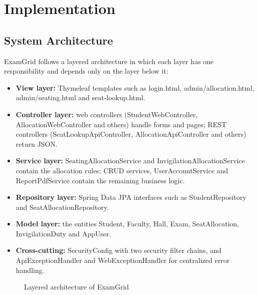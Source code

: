 \documentclass[12pt,letterpaper]{article}
\renewcommand{\texttt}[1]{#1}
\renewcommand{\thesection}{\arabic{section}}
\newcommand{\chapter}[1]{\clearpage\refstepcounter{section}\section*{#1}\label{ch:\thesection}}
\begin{document}
\chapter{Implementation}
\subsection{System Architecture}
ExamGrid follows a layered architecture in which each layer has one responsibility and depends only on the layer below it:
\begin{itemize}
  \item \textbf{View layer:} Thymeleaf templates such as \texttt{login.html}, \texttt{admin/allocation.html}, \texttt{admin/seating.html} and \texttt{seat-lookup.html}.
  \item \textbf{Controller layer:} web controllers (\texttt{StudentWebController}, \texttt{AllocationWebController} and others) handle forms and pages; REST controllers (\texttt{SeatLookupApiController}, \texttt{AllocationApiController} and others) return JSON.
  \item \textbf{Service layer:} \texttt{SeatingAllocationService} and \texttt{InvigilationAllocationService} contain the allocation rules; CRUD services, \texttt{UserAccountService} and \texttt{ReportPdfService} contain the remaining business logic.
  \item \textbf{Repository layer:} Spring Data JPA interfaces such as \texttt{StudentRepository} and \texttt{SeatAllocationRepository}.
  \item \textbf{Model layer:} the entities \texttt{Student}, \texttt{Faculty}, \texttt{Hall}, \texttt{Exam}, \texttt{SeatAllocation}, \texttt{InvigilationDuty} and \texttt{AppUser}.
  \item \textbf{Cross-cutting:} \texttt{SecurityConfig} with two security filter chains, and \texttt{ApiExceptionHandler} and \texttt{WebExceptionHandler} for centralized error handling.
\end{itemize}
\begin{figure}[H]\centering
\resizebox{0.8\linewidth}{!}{}
\caption{Layered architecture of ExamGrid}
\end{figure}
\end{document}
